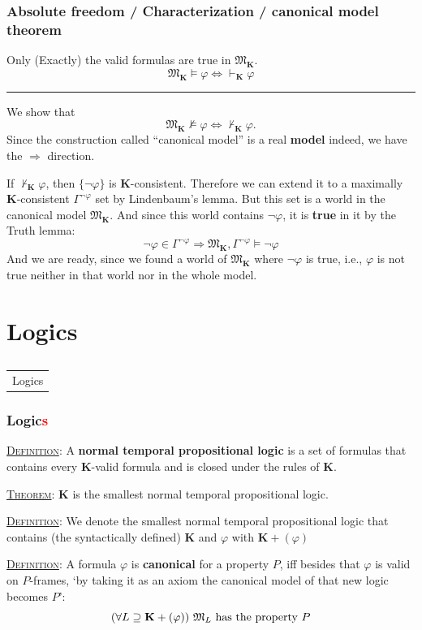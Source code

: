\documentclass[xcolor=x11names]{beamer}
\makeatletter
\let\beamer@writeslidentry@miniframeson=\beamer@writeslidentry
\def\beamer@writeslidentry@miniframesoff{%
  \expandafter\beamer@ifempty\expandafter{\beamer@framestartpage}{}%
  {%
    \clearpage\beamer@notesactions%
  }
}
\newcommand*{\miniframeson}{\let\beamer@writeslidentry=\beamer@writeslidentry@miniframeson}
\newcommand*{\miniframesoff}{\let\beamer@writeslidentry=\beamer@writeslidentry@miniframesoff}
\newcommand{\cimdia}[1] {\miniframesoff \begin{frame}\begin{center}\huge \begin{tabular}{c}#1\end{tabular}\end{center}\end{frame}\miniframeson}
\newcommand{\szakasz}[2][]{\section{#1}\subsection{}\cimdia{#2}}
\newcommand{\cemph}[1]{\textcolor{red}{#1}}
\renewcommand{\emph}[1]{\textbf{#1}}
\newcommand{\dzsa}[1]{\textsc{\underline{#1}}:}
\newcommand{\forallp}[1]{(\forall #1)}
\makeatother
\begin{document}

\begin{frame}
\frametitle{Absolute freedom / Characterization / canonical model theorem}
Only (Exactly) the valid formulas are true in $\mathfrak M_{\mathbf K}$.
\[ \mathfrak M_{\mathbf K} \models \varphi \iff \vdash_\mathbf K  \varphi \]
\hrule

\medskip

We show that
\[ \mathfrak M_{\mathbf K} \not\models \varphi \iff \not\vdash_\mathbf K  \varphi .\]
Since the construction called ``canonical model'' is a real \emph{model} indeed, we have the $\Rightarrow$ direction.

If $\not\vdash_\mathbf K \varphi$, then $\{\lnot \varphi\}$ is $\mathbf K$-consistent. Therefore we can extend it to a maximally $\mathbf K$-consistent $\Gamma^{\lnot \varphi}$ set by Lindenbaum's lemma. But this set is a world in the canonical model $\mathfrak M_\mathbf K$. And since this world contains $\lnot \varphi$, it is \emph{true} in it by the Truth lemma:
\[ \lnot \varphi \in \Gamma ^{\lnot \varphi} \Longrightarrow \mathfrak M _{\mathbf K} , \Gamma^{\lnot \varphi} \models \lnot \varphi \]
And we are ready, since we found a world of $\mathfrak M_\mathbf K$ where $\lnot \varphi$ is true, i.e., $\varphi$ is not true neither in that world nor in the whole model.

\end{frame}


\szakasz[Logics]{Logics}

\begin{frame}
\frametitle{Logic\cemph s}
\dzsa{Definition}
A \emph{normal temporal propositional logic} is a set of formulas that contains every $\mathbf K$-valid formula and is closed under the rules of $\mathbf K$.

\bigskip

\dzsa{Theorem}
$\mathbf K$ is the smallest normal temporal propositional logic.

\bigskip

\dzsa{Definition}
We denote the smallest normal temporal propositional logic that contains (the syntactically defined) $\mathbf K$ and $\varphi$ with $\mathbf K + (\varphi)$

\bigskip

\dzsa{Definition} A formula $\varphi$ is \emph{canonical} for a property $P$, iff besides that $\varphi$ is valid on $P$-frames, `by taking it as an axiom the canonical model of that new logic becomes $P$':
\[ \forallp {L\supseteq \mathbf K + (\varphi)} \textup{ $\mathfrak M _{L}$ has the property $P$} \]

\end{frame}
\end{document}
